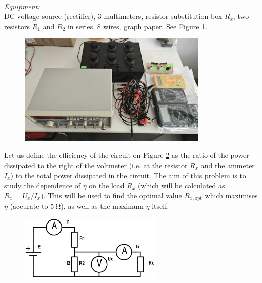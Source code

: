 \documentclass[../TST.tex]{subfiles}
\begin{document}
\begin{eproblem}{\ \\[5pt]}
\textit{Equipment:}\\
DC voltage source (rectifier), 3 multimeters, resistor substitution box $R_x$, two resistors $R_1$ and $R_2$ in series, 8 wires, graph paper. See Figure \ref{fig3}.\\

\begin{figure}[h]
\centering
\includegraphics[width=0.8\textwidth]{fig/2015_e1.jpg}
\caption{}
\label{fig3}
\end{figure}

Let us define the efficiency of the circuit on Figure \ref{fig4} as the ratio of the power dissipated to the right of the voltmeter (i.e. at the resistor $R_x$ and the ammeter $I_x$) to the total power dissipated in the circuit. The aim of this problem is to study the dependence of $\eta$ on the load $R_x$ (which will be calculated as $R_x=U_x/I_x$). This will be used to find the optimal value $R_{x,\mathrm{opt}}$ which maximises $\eta$ (accurate to $\qty{5}{\ohm}$), as well as the maximum $\eta$ itself. 
\begin{figure}[h]
\centering
\includegraphics[width=0.6\textwidth]{fig/2015_l2.png}
\caption{}
\label{fig4}
\end{figure}


\end{eproblem}
\end{document}
